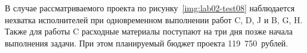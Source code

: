 
В случае рассматриваемого проекта по рисунку~\ref{img:lab02-test08} наблюдается
нехватка исполнителей при одновременном выполнении работ C, D, J и B, G, H.
Также для работы C расходные материалы поступают на три дня позже начала
выполнения задачи. При этом планируемый бюджет проекта 119~750~рублей.
